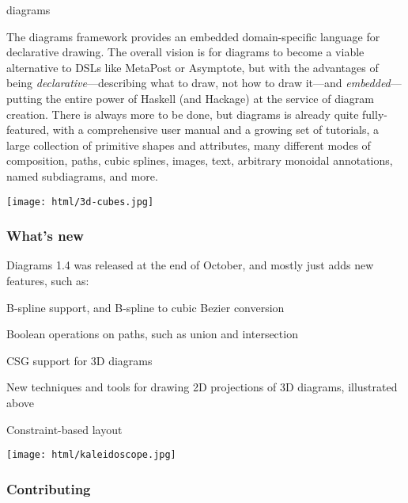 \begin{hcarentry}[updated]{diagrams}
\makeheader

The diagrams framework provides an embedded domain-specific language
for declarative drawing.  The overall vision is for diagrams to become
a viable alternative to DSLs like MetaPost or Asymptote, but with the
advantages of being \emph{declarative}---describing what to draw, not
how to draw it---and \emph{embedded}---putting the entire power of
Haskell (and Hackage) at the service of diagram creation.  There is
always more to be done, but diagrams is already quite fully-featured,
with a comprehensive user manual and a growing set of tutorials, a
large collection of primitive shapes and attributes, many different
modes of composition, paths, cubic splines, images, text, arbitrary
monoidal annotations, named subdiagrams, and more.

\begin{center}
\texttt{[image: html/3d-cubes.jpg]}
\end{center}

\subsubsection*{What's new}

Diagrams 1.4 was released at the end of October, and mostly just adds
new features, such as:

\begin{compactitem}
\item B-spline support, and B-spline to cubic Bezier conversion
\item Boolean operations on paths, such as union and intersection
\item CSG support for 3D diagrams
\item New techniques and tools for drawing 2D projections of 3D
  diagrams, illustrated above
\item Constraint-based layout
\end{compactitem}

\begin{center}
\texttt{[image: html/kaleidoscope.jpg]}
\end{center}

\subsubsection*{Contributing}


\end{hcarentry}
